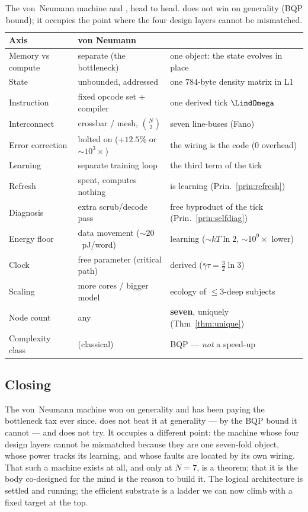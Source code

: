 \begin{table}[H]
\centering\small
\caption{The von~Neumann machine and \TALOS{}, head to head. \TALOS{} does
not win on generality (BQP bound); it occupies the point where the four
design layers cannot be mismatched.}
\label{tab:vn-vs-talos}
\begin{tabular}{@{}p{3.4cm}p{4.3cm}p{4.5cm}@{}}
\toprule
\textbf{Axis} & \textbf{von Neumann} & \textbf{\TALOS{}} \\
\midrule
Memory vs compute & separate (the bottleneck) & one object: the state evolves in place \\
State & unbounded, addressed & one $784$-byte density matrix in L1 \\
Instruction & fixed opcode set + compiler & one derived tick $\LindOmega$ \\
Interconnect & crossbar / mesh, $\binom{N}{2}$ & seven line-buses (Fano) \\
Error correction & bolted on ($+12.5\%$ or $\sim\!10^3\times$) & the wiring is the code ($0$ overhead) \\
Learning & separate training loop & the third term of the tick \\
Refresh & spent, computes nothing & is learning (Prin.~\ref{prin:refresh}) \\
Diagnosis & extra scrub/decode pass & free byproduct of the tick (Prin.~\ref{prin:selfdiag}) \\
Energy floor & data movement ($\sim\!20$~pJ/word) & learning ($\sim kT\ln2$, $\sim\!10^{9}\times$ lower) \\
Clock & free parameter (critical path) & derived ($\bar\gamma\tau=\tfrac32\ln3$) \\
Scaling & more cores / bigger model & ecology of $\le 3$-deep subjects \\
Node count & any & \textbf{seven}, uniquely (Thm~\ref{thm:unique}) \\
Complexity class & (classical) & BQP --- \emph{not} a speed-up \\
\bottomrule
\end{tabular}
\end{table}

\subsection{Closing}

The von~Neumann machine won on generality and has been paying the bottleneck
tax ever since. \TALOS{} does not beat it at generality --- by the BQP bound
it cannot --- and does not try. It occupies a different point: the machine
whose four design layers cannot be mismatched because they are one seven-fold
object, whose power tracks its learning, and whose faults are located by its
own wiring. That such a machine exists at all, and only at $N=7$, is a
theorem; that it is the body co-designed for the \SYNARC{} mind is the reason
to build it. The logical architecture is settled and running; the efficient
substrate is a ladder we can now climb with a fixed target at the top.
